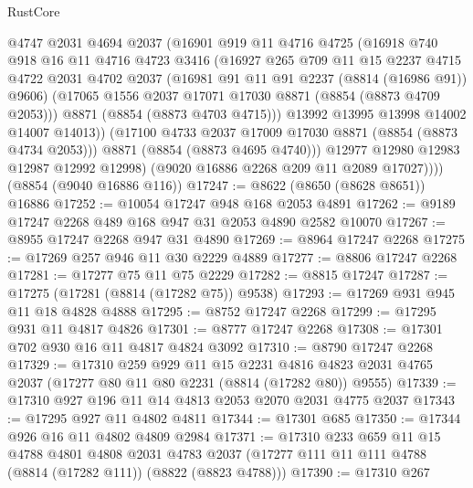 \begin{lexlean}{RustCore}
\begin{coremodule}
              @4747
              @2031
              @4694
              @2037
              (@16901
                @919
                @11
                @4716
                @4725
                (@16918
                  @740
                  @918
                  @16
                  @11
                  @4716
                  @4723
                  @3416
                  (@16927
                    @265
                    @709
                    @11
                    @15
                    @2237
                    @4715
                    @4722
                    @2031
                    @4702
                    @2037
                    (@16981 @91 @11 @91 @2237 (@8814 (@16986 @91)) @9606)
                    (@17065 @1556 @2037 @17071 @17030 @8871 (@8854 (@8873 @4709 @2053)))
                    @8871
                    (@8854 (@8873 @4703 @4715)))
                  @13992
                  @13995
                  @13998
                  @14002
                  @14007
                  @14013))
              (@17100 @4733 @2037 @17009 @17030 @8871 (@8854 (@8873 @4734 @2053)))
              @8871
              (@8854 (@8873 @4695 @4740)))
            @12977
            @12980
            @12983
            @12987
            @12992
            @12998)
          (@9020 @16886 @2268 @209 @11 @2089 @17027))))
    (@8854 (@9040 @16886 @116))
@17247 := @8622 (@8650 (@8628 @8651)) @16886
@17252 := @10054 @17247 @948 @168 @2053 @4891
@17262 := @9189 @17247 @2268 @489 @168 @947 @31 @2053 @4890 @2582 @10070
@17267 := @8955 @17247 @2268 @947 @31 @4890
@17269 := @8964 @17247 @2268
@17275 := @17269 @257 @946 @11 @30 @2229 @4889
@17277 := @8806 @17247 @2268
@17281 := @17277 @75 @11 @75 @2229
@17282 := @8815 @17247
@17287 := @17275 (@17281 (@8814 (@17282 @75)) @9538)
@17293 := @17269 @931 @945 @11 @18 @4828 @4888
@17295 := @8752 @17247 @2268
@17299 := @17295 @931 @11 @4817 @4826
@17301 := @8777 @17247 @2268
@17308 := @17301 @702 @930 @16 @11 @4817 @4824 @3092
@17310 := @8790 @17247 @2268
@17329 := @17310
    @259
    @929
    @11
    @15
    @2231
    @4816
    @4823
    @2031
    @4765
    @2037
    (@17277 @80 @11 @80 @2231 (@8814 (@17282 @80)) @9555)
@17339 := @17310 @927 @196 @11 @14 @4813 @2053 @2070 @2031 @4775 @2037
@17343 := @17295 @927 @11 @4802 @4811
@17344 := @17301 @685
@17350 := @17344 @926 @16 @11 @4802 @4809 @2984
@17371 := @17310
    @233
    @659
    @11
    @15
    @4788
    @4801
    @4808
    @2031
    @4783
    @2037
    (@17277 @111 @11 @111 @4788 (@8814 (@17282 @111)) (@8822 (@8823 @4788)))
@17390 := @17310
    @267

\end{coremodule}
\end{lexlean}
